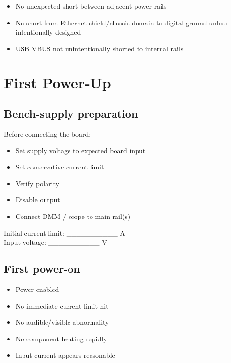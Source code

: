 \documentclass[10pt,a4paper,oneside]{report}
\providecommand{\tightlist}{\setlength{\itemsep}{1pt}\setlength{\parskip}{1pt}}
\begin{document}
\begin{itemize}
\tightlist
\item[$\square$]
  No unexpected short between adjacent power rails
\item[$\square$]
  No short from Ethernet shield/chassis domain to digital ground unless intentionally designed
\item[$\square$]
  USB VBUS not unintentionally shorted to internal rails
\end{itemize}

\section{First Power-Up}\label{wiki-hardware-bring-up-and-testing--2-first-power-up}

\subsection{Bench-supply preparation}\label{wiki-hardware-bring-up-and-testing--21-bench-supply-preparation}

Before connecting the board:

\begin{itemize}
\tightlist
\item[$\square$]
  Set supply voltage to expected board input
\item[$\square$]
  Set conservative current limit
\item[$\square$]
  Verify polarity
\item[$\square$]
  Disable output
\item[$\square$]
  Connect DMM / scope to main rail(s)
\end{itemize}

Initial current limit: \_\_\_\_\_\_\_\_\_\_ A\\
Input voltage: \_\_\_\_\_\_\_\_\_\_ V

\subsection{First power-on}\label{wiki-hardware-bring-up-and-testing--22-first-power-on}

\begin{itemize}
\tightlist
\item[$\square$]
  Power enabled
\item[$\square$]
  No immediate current-limit hit
\item[$\square$]
  No audible/visible abnormality
\item[$\square$]
  No component heating rapidly
\item[$\square$]
  Input current appears reasonable
\end{itemize}
\end{document}
